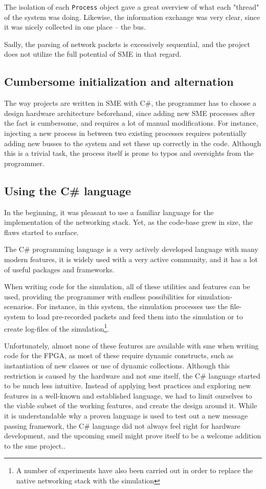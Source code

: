 The isolation of each \texttt{Process} object gave a great overview of what each
"thread" of the system was doing. Likewise, the information exchange was very
clear, since it was nicely collected in one place -- the bus.

Sadly, the parsing of network packets is excessively sequential, and the
project does not utilize the full potential of SME in that regard.

\subsection{Cumbersome initialization and alternation}
The way projects are written in SME with C\#, the programmer has to
choose a design hardware architecture beforehand, since adding new SME
processes after the fact is cumbersome, and requires a lot of manual
modifications.
For instance, injecting a new process in between two existing processes
requires potentially adding new busses to the system and set these up correctly
in the code. Although this is a trivial task, the process itself is prone to
typos and oversights from the programmer.


\subsection{Using the C\# language}
In the beginning, it was pleasant to use a familiar language for the
implementation of the networking stack. Yet, as the code-base grew in size, the
flaws started to surface.

The C\# programming language is a very actively developed language with many
modern features, it is widely used with a very active community, and it has a lot
of useful packages and frameworks.

When writing code for the simulation, all of these utilities and features can
be used, providing the programmer with endless possibilities for
simulation-scenarios. For instance, in this system, the simulation processes use the
file-system to load pre-recorded packets and feed them into the
simulation or to create log-files of the simulation\footnote{
A number of experiments have also been carried out in order to replace the
native networking stack with the simulation}.

Unfortunately, almost none of these features are available with \gls{sme}
when writing code for the FPGA, as most of these require dynamic constructs,
such as instantiation of new classes or use of dynamic collections. Although
this restriction is caused by the hardware and not \gls{sme} itself,
the C\# language started to be much less intuitive. Instead of applying
best practices and exploring new features in a well-known and established
language, we had to limit ourselves to the viable subset of the working
features, and create the design around it. While it is understandable why
a proven language is used to test out a new message passing framework,
the C\# language did not always feel right for hardware development, and
the upcoming \gls{smeil} might prove itself to be a welcome addition to
the \gls{sme} project.\cite{github_smeil}.


